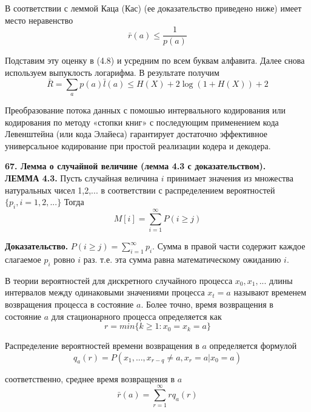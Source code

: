 \documentclass[14pt]{article}
\begin{document}
В соответствии с леммой Каца (Кас) (ее доказательство приведено ниже) имеет место неравенство
\begin{displaymath}
    \bar{r}(a) \leq \frac{1}{p(a)}
\end{displaymath}

Подставим эту оценку в (4.8) и усредним по всем буквам алфавита. Далее снова используем выпуклость логарифма. В результате получим
\begin{displaymath}
    \bar{R} = \sum_{a} p(a)\bar{l}(a) \leq H(X) + 2\log(1 + H(X)) + 2
\end{displaymath}

Преобразование потока данных с помошью интервального кодирования или кодирования по методу «стопки книг» с последующим применением кода Левенштейна (или кода Элайеса) гарантирует достаточно эффективное универсальное кодирование при простой реализации кодера и декодера.

\bigskip
\textbf{67. Лемма о случайной величине (лемма 4.3 с доказательством).} \\

\textbf{ЛЕММА 4.3.} Пусть случайная величина \(i\) принимает значения из множества натуральных чисел {1,2,...} в соответствии с распределением вероятностей \(\{p_i, i = 1,2,...\}\) Тогда
\begin{displaymath}
    M[i] = \sum_{i=1}^{\infty} P(i \geq j)
\end{displaymath}

\textbf{Доказательство.} \(P(i \geq j) = \sum_{i=1}^{\infty} p_i\). Сумма в правой части содержит
каждое слагаемое \(p_i\) ровно \(i\) раз. т.е. эта сумма равна математическому
ожиданию \(i\).

В теории вероятностей для дискретного случайного процесса \(x_0, x_1, ...\) длины интервалов между одинаковыми значениями процесса \(x_t = a\) называют временем возвращения процесса в состояние \(a\). Более точно, время возвращения в состояние \(a\) для стационарного процесса определяется как
\begin{displaymath}
    r = min\{k \geq 1: x_0 = x_k = a\}
\end{displaymath}

Распределение вероятностей времени возвращения в \(a\) определяется формулой
\begin{displaymath}
    q_a(r) = P(x_1,...,x_{r-q} \neq a, x_r = a | x_0 = a)
\end{displaymath}

соответственно, среднее время возвращения в \(a\)
\begin{displaymath}
    \bar{r}(a) = \sum_{r=1}^{\infty} r q_a(r)
\end{displaymath}
\end{document}
